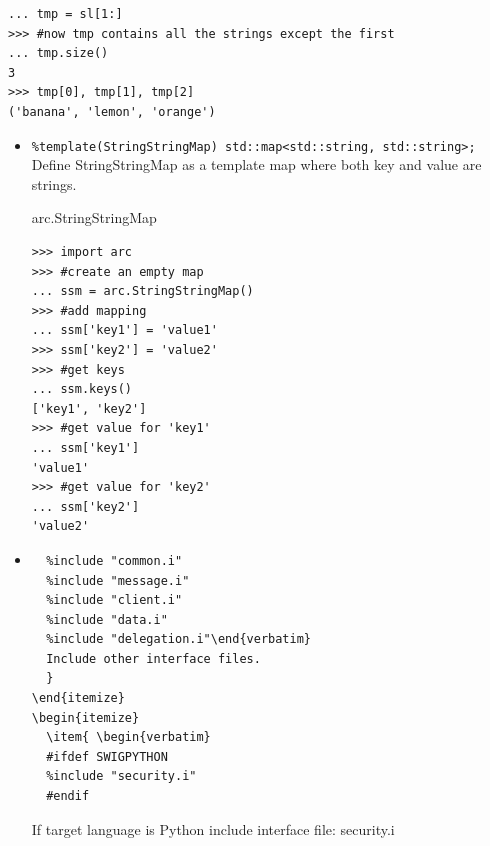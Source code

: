 \documentclass{article}
\begin{document}
\begin{flushleft}
\begin{itemize}
{\begin{example}
\begin{verbatim}
... tmp = sl[1:]
>>> #now tmp contains all the strings except the first
... tmp.size()
3
>>> tmp[0], tmp[1], tmp[2]
('banana', 'lemon', 'orange')
\end{verbatim}
    \end{example}
  }
\end{itemize}
\begin{itemize}
  \item{\verb$%template(StringStringMap) std::map<std::string, std::string>;$ \linebreak
    Define StringStringMap as a template map where both key and value are strings.\linebreak
    \begin{example}
      \caption{arc.StringStringMap}\label{mapex}
\begin{verbatim}
>>> import arc
>>> #create an empty map
... ssm = arc.StringStringMap()
>>> #add mapping
... ssm['key1'] = 'value1'
>>> ssm['key2'] = 'value2'
>>> #get keys
... ssm.keys()
['key1', 'key2']
>>> #get value for 'key1'
... ssm['key1']
'value1'
>>> #get value for 'key2'
... ssm['key2']
'value2'
\end{verbatim}
    \end{example}
  }
\end{itemize}
\begin{itemize}
  \item{
\begin{verbatim}
  %include "common.i"
  %include "message.i"
  %include "client.i"
  %include "data.i"
  %include "delegation.i"\end{verbatim}
  Include other interface files.
  }
\end{itemize}
\begin{itemize}
  \item{ \begin{verbatim}
  #ifdef SWIGPYTHON
  %include "security.i"
  #endif\end{verbatim}
  If target language is Python include interface file: security.i
  }
\end{itemize}
\end{flushleft}

\end{document}
